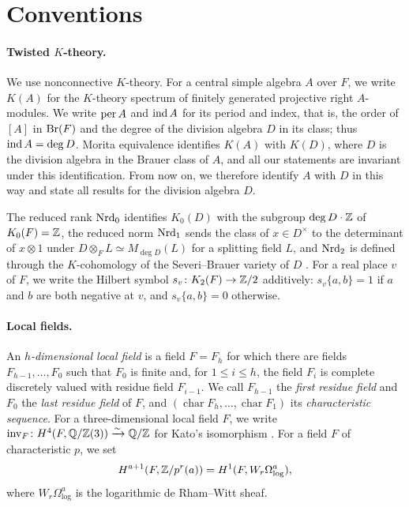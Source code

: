 \section*{Conventions}

\paragraph{Twisted $K$-theory.}
We use nonconnective $K$-theory.
For a central simple algebra $A$ over $F$, we write $K(A)$ for the $K$-theory spectrum of finitely generated projective right $A$-modules.
We write $\operatorname{per} A$ and $\operatorname{ind} A$ for its period and index, that is, the order of $[A]$ in $\operatorname{Br}(F)$ and the degree of the division algebra \(D\) in its class; thus $\operatorname{ind} A=\deg D$.
Morita equivalence identifies $K(A)$ with $K(D)$, where $D$ is the division algebra in the Brauer class of $A$, and all our statements are invariant under this identification.
From now on, we therefore identify $A$ with $D$ in this way and state all results for the division algebra $D$.

The reduced rank \(\operatorname{Nrd}_0\) identifies $K_0(D)$ with the subgroup $\deg D\cdot\mathbb Z$ of $K_0(F)=\mathbb Z$, the reduced norm $\operatorname{Nrd}_1$ sends the class of $x\in D^\times$ to the determinant of $x\otimes1$ under $D\otimes_FL\simeq M_{\deg D}(L)$ for a splitting field $L$, and $\operatorname{Nrd}_2$ is defined through the $K$-cohomology of the Severi--Brauer variety of $D$ \cite{MerkurjevSuslin1982,Suslin1987}.
For a real place $v$ of $F$, we write the Hilbert symbol $s_v\colon K_2(F)\to\mathbb Z/2$ additively: $s_v\{a,b\}=1$ if $a$ and $b$ are both negative at $v$, and $s_v\{a,b\}=0$ otherwise.


\paragraph{Local fields.}
An \emph{$h$-dimensional local field} is a field $F=F_h$ for which there are fields $F_{h-1},\ldots,F_0$ such that $F_0$ is finite and, for $1\le i\le h$, the field $F_i$ is complete discretely valued with residue field $F_{i-1}$.
We call $F_{h-1}$ the \emph{first residue field} and $F_0$ the \emph{last residue field} of $F$, and $(\operatorname{char}F_h,\ldots,\operatorname{char}F_1)$ its \emph{characteristic sequence}.
For a three-dimensional local field $F$, we write $\operatorname{inv}_F\colon H^4(F,\mathbb Q/\mathbb Z(3))\xrightarrow{\sim}\mathbb Q/\mathbb Z$ for Kato's isomorphism \cite[Theorem 2]{KatoExistence}.
For a field $F$ of characteristic $p$, we set
\[
 H^{a+1}(F,\mathbb Z/p^r(a))=H^1(F,W_r\Omega^a_{\log}),
\]
where $W_r\Omega^a_{\log}$ is the logarithmic de Rham--Witt sheaf.

